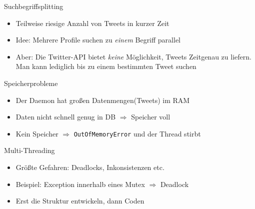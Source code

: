 \begin{frame}{Suchbegriffsplitting}
	\begin{itemize}
		\item Teilweise riesige Anzahl von Tweets in kurzer Zeit %
		\item Idee: Mehrere Profile suchen zu \emph{einem} Begriff parallel
		\item Aber: Die Twitter-API bietet \emph{keine} Möglichkeit, Tweets Zeitgenau zu liefern. Man kann lediglich bis zu einem bestimmten Tweet suchen
	\end{itemize}
\end{frame}

\begin{frame}{Speicherprobleme}
	\begin{itemize}
		\item Der Daemon hat großen Datenmengen(Tweets) im RAM
		\item Daten nicht schnell genug in DB $\Rightarrow$ Speicher voll
		\item Kein Speicher $\Rightarrow$ \texttt{OutOfMemoryError} und der Thread stirbt
	\end{itemize}
\end{frame}

\begin{frame}{Multi-Threading}
	\begin{itemize}
		\item Größte Gefahren: Deadlocks, Inkonsistenzen etc.
		\item Beispiel: Exception innerhalb eines Mutex $\Rightarrow$ Deadlock
		\item Erst die Struktur entwickeln, dann Coden
	\end{itemize}
\end{frame}